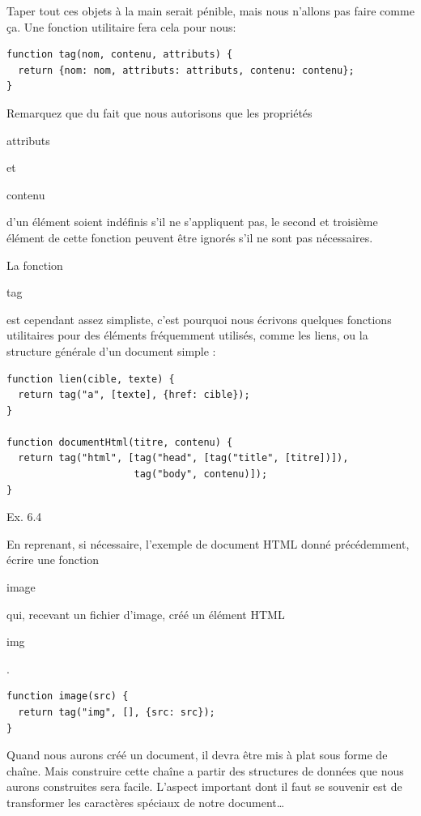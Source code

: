 \documentclass{FramateX}
\renewcommand{\texttt}[1]{\begin{sffamily}{#1}\end{sffamily}}
\begin{document}
Taper tout ces objets à la main serait pénible, mais nous n'allons pas
faire comme ça. Une fonction utilitaire fera cela pour nous:

\begin{lstlisting}
function tag(nom, contenu, attributs) {
  return {nom: nom, attributs: attributs, contenu: contenu};
}
\end{lstlisting}
Remarquez que du fait que nous autorisons que les propriétés
\texttt{attributs} et \texttt{contenu} d'un élément soient indéfinis
s'il ne s'appliquent pas, le second et troisième élément de cette
fonction peuvent être ignorés s'il ne sont pas nécessaires.

La fonction \texttt{tag} est cependant assez simpliste, c'est pourquoi
nous écrivons quelques fonctions utilitaires pour des éléments
fréquemment utilisés, comme les liens, ou la structure générale d'un
document simple :

\begin{lstlisting}
function lien(cible, texte) {
  return tag("a", [texte], {href: cible});
}

function documentHtml(titre, contenu) {
  return tag("html", [tag("head", [tag("title", [titre])]),
                      tag("body", contenu)]);
}
\end{lstlisting}
\begin{center}\end{center}

Ex. 6.4

En reprenant, si nécessaire, l'exemple de document HTML donné
précédemment, écrire une fonction \texttt{image} qui, recevant un
fichier d'image, créé un élément HTML \texttt{img}.

\begin{lstlisting}
function image(src) {
  return tag("img", [], {src: src});
}
\end{lstlisting}
\begin{center}\end{center}

Quand nous aurons créé un document, il devra être mis à plat sous forme
de chaîne. Mais construire cette chaîne a partir des structures de
données que nous aurons construites sera facile. L'aspect important dont
il faut se souvenir est de transformer les caractères spéciaux de notre
document\ldots{}
\end{document}
